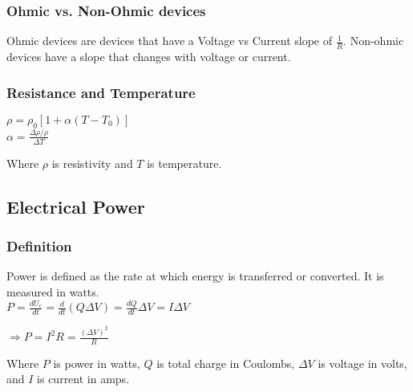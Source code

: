 \subsubsection*{Ohmic vs. Non-Ohmic devices}
\hspace{.5cm} Ohmic devices are devices that have a Voltage vs Current slope of $\frac{1}{R}$. Non-ohmic devices have a slope that changes with voltage or current.\\

\subsubsection*{Resistance and Temperature}
\vbox{
    \large\center
    $\rho = \rho_0[1+\alpha (T-T_0)]$\\
    \vspace{12pt}
    $\alpha = \frac{\Delta \rho/\rho}{\Delta T}$
}
\vspace{12pt}

Where $\rho$ is resistivity and $T$ is temperature.

\vspace{12pt}
\hrulefill

\begin{center}
\subsection*{Electrical Power}
\end{center}

\subsubsection*{Definition}
\hspace{.5cm} Power is defined as the rate at which energy is transferred or converted. It is measured in watts.\\
\vbox{
    \large\center
    $P = \frac{dU_e}{dt} = \frac{d}{dt} (Q\Delta V) = \frac{dQ}{dt}\Delta V = I\Delta V$
}

\vbox{
    \large\center
    $\Longrightarrow P = I^2R = \frac{(\Delta V)^2}{R}$
}
\vspace{12pt}

Where $P$ is power in watts, $Q$ is total charge in Coulombs, $\Delta V$ is voltage in volts, and $I$ is current in amps.